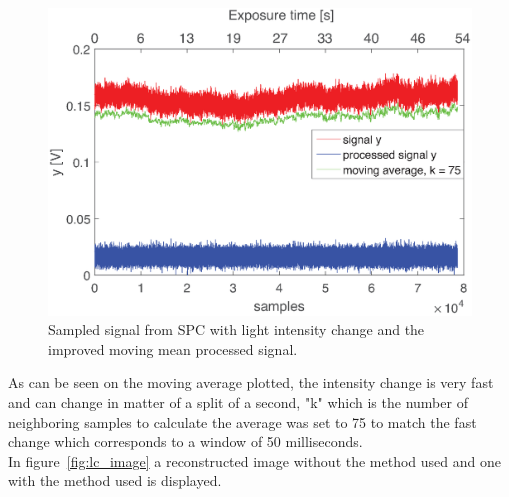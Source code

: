 \begin{figure}[H]
\includegraphics[width = 0.8\linewidth]{result/luminance/li.eps}
	\caption{Sampled signal from SPC with light intensity change and the improved moving mean processed signal.}
	\label{fig:lc_plot}
\end{figure}

As can be seen on the moving average plotted, the intensity change is very fast and can change in matter of a split of a second, "k" which is the number of neighboring samples to calculate the average  was set to 75 to match the fast change which corresponds to a window of 50 milliseconds.\\[0.1in]

In figure~\ref{fig:lc_image} a reconstructed image without the method used and one with the method used is displayed.

